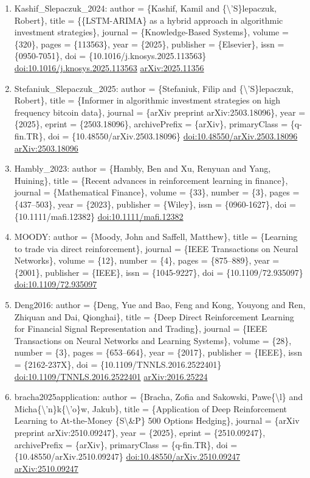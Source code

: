 \documentclass[11pt]{article}
\begin{document}
\begin{enumerate}[leftmargin=*]
  \item Kashif\_Slepaczuk\_2024: author = \{Kashif, Kamil and \{\textbackslash{}'S\}lepaczuk, Robert\}, title = \{\{LSTM-ARIMA\} as a hybrid approach in algorithmic investment strategies\}, journal = \{Knowledge-Based Systems\}, volume = \{320\}, pages = \{113563\}, year = \{2025\}, publisher = \{Elsevier\}, issn = \{0950-7051\}, doi = \{10.1016/j.knosys.2025.113563\} \href{https://doi.org/10.1016/j.knosys.2025.113563}{doi:10.1016/j.knosys.2025.113563} \href{https://arxiv.org/abs/2025.11356}{arXiv:2025.11356}
  \item Stefaniuk\_Slepaczuk\_2025: author = \{Stefaniuk, Filip and \{\textbackslash{}'S\}lepaczuk, Robert\}, title = \{Informer in algorithmic investment strategies on high frequency bitcoin data\}, journal = \{arXiv preprint arXiv:2503.18096\}, year = \{2025\}, eprint = \{2503.18096\}, archivePrefix = \{arXiv\}, primaryClass = \{q-fin.TR\}, doi = \{10.48550/arXiv.2503.18096\} \href{https://doi.org/10.48550/arXiv.2503.18096}{doi:10.48550/arXiv.2503.18096} \href{https://arxiv.org/abs/2503.18096}{arXiv:2503.18096}
  \item Hambly\_2023: author = \{Hambly, Ben and Xu, Renyuan and Yang, Huining\}, title = \{Recent advances in reinforcement learning in finance\}, journal = \{Mathematical Finance\}, volume = \{33\}, number = \{3\}, pages = \{437--503\}, year = \{2023\}, publisher = \{Wiley\}, issn = \{0960-1627\}, doi = \{10.1111/mafi.12382\} \href{https://doi.org/10.1111/mafi.12382}{doi:10.1111/mafi.12382}
  \item MOODY: author = \{Moody, John and Saffell, Matthew\}, title = \{Learning to trade via direct reinforcement\}, journal = \{IEEE Transactions on Neural Networks\}, volume = \{12\}, number = \{4\}, pages = \{875--889\}, year = \{2001\}, publisher = \{IEEE\}, issn = \{1045-9227\}, doi = \{10.1109/72.935097\} \href{https://doi.org/10.1109/72.935097}{doi:10.1109/72.935097}
  \item Deng2016: author = \{Deng, Yue and Bao, Feng and Kong, Youyong and Ren, Zhiquan and Dai, Qionghai\}, title = \{Deep Direct Reinforcement Learning for Financial Signal Representation and Trading\}, journal = \{IEEE Transactions on Neural Networks and Learning Systems\}, volume = \{28\}, number = \{3\}, pages = \{653--664\}, year = \{2017\}, publisher = \{IEEE\}, issn = \{2162-237X\}, doi = \{10.1109/TNNLS.2016.2522401\} \href{https://doi.org/10.1109/TNNLS.2016.2522401}{doi:10.1109/TNNLS.2016.2522401} \href{https://arxiv.org/abs/2016.25224}{arXiv:2016.25224}
  \item bracha2025application: author = \{Bracha, Zofia and Sakowski, Pawe\{\textbackslash{}l\} and Micha\{\textbackslash{}'n\}k\{\textbackslash{}'o\}w, Jakub\}, title = \{Application of Deep Reinforcement Learning to At-the-Money \{S\textbackslash{}\&P\} 500 Options Hedging\}, journal = \{arXiv preprint arXiv:2510.09247\}, year = \{2025\}, eprint = \{2510.09247\}, archivePrefix = \{arXiv\}, primaryClass = \{q-fin.TR\}, doi = \{10.48550/arXiv.2510.09247\} \href{https://doi.org/10.48550/arXiv.2510.09247}{doi:10.48550/arXiv.2510.09247} \href{https://arxiv.org/abs/2510.09247}{arXiv:2510.09247}

\end{enumerate}
\end{document}

